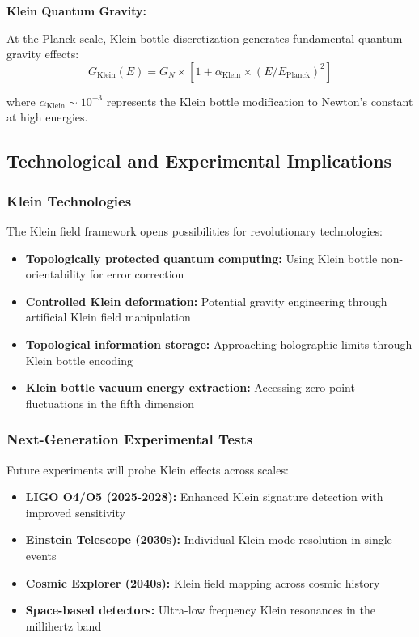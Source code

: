 \documentclass[12pt]{iopart}
\begin{document}
\textbf{Klein Quantum Gravity:}

At the Planck scale, Klein bottle discretization generates fundamental quantum gravity effects:
\begin{equation}
G_{\text{Klein}}(E) = G_N \times [1 + \alpha_{\text{Klein}} \times (E/E_{\text{Planck}})^2]
\end{equation}

where $\alpha_{\text{Klein}} \sim 10^{-3}$ represents the Klein bottle modification to Newton's constant at high energies.

\subsection{Technological and Experimental Implications}

\subsubsection{Klein Technologies}

The Klein field framework opens possibilities for revolutionary technologies:
\begin{itemize}
\item \textbf{Topologically protected quantum computing:} Using Klein bottle non-orientability for error correction
\item \textbf{Controlled Klein deformation:} Potential gravity engineering through artificial Klein field manipulation
\item \textbf{Topological information storage:} Approaching holographic limits through Klein bottle encoding
\item \textbf{Klein bottle vacuum energy extraction:} Accessing zero-point fluctuations in the fifth dimension
\end{itemize}

\subsubsection{Next-Generation Experimental Tests}

Future experiments will probe Klein effects across scales:
\begin{itemize}
\item \textbf{LIGO O4/O5 (2025-2028):} Enhanced Klein signature detection with improved sensitivity
\item \textbf{Einstein Telescope (2030s):} Individual Klein mode resolution in single events
\item \textbf{Cosmic Explorer (2040s):} Klein field mapping across cosmic history
\item \textbf{Space-based detectors:} Ultra-low frequency Klein resonances in the millihertz band
\end{itemize}
\end{document}
